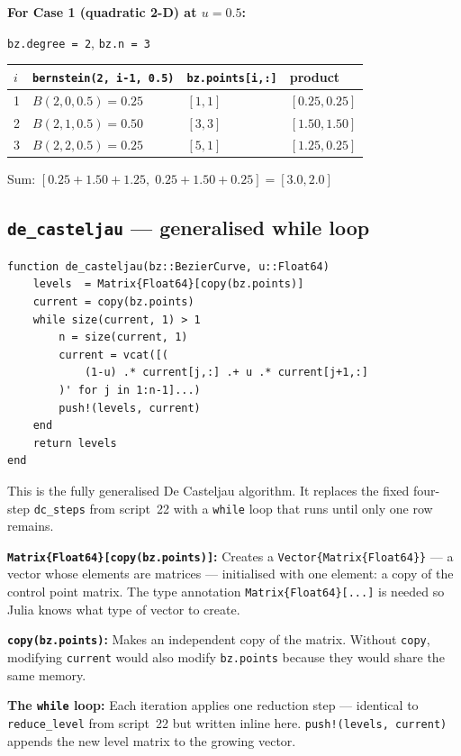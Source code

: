 \documentclass[12pt, a4paper]{article}
\newcommand{\cd}[1]{\texttt{#1}}
\begin{document}
\begin{examplebox}
\textbf{For Case 1 (quadratic 2-D) at $u = 0.5$:}

\cd{bz.degree = 2}, \cd{bz.n = 3}

\medskip
\begin{tabular}{llll}
\toprule
$i$ & \cd{bernstein(2, i-1, 0.5)} & \cd{bz.points[i,:]} & product \\
\midrule
1 & $B(2,0,0.5) = 0.25$ & $[1,1]$ & $[0.25, 0.25]$ \\
2 & $B(2,1,0.5) = 0.50$ & $[3,3]$ & $[1.50, 1.50]$ \\
3 & $B(2,2,0.5) = 0.25$ & $[5,1]$ & $[1.25, 0.25]$ \\
\bottomrule
\end{tabular}

\medskip
Sum: $[0.25+1.50+1.25,\; 0.25+1.50+0.25] = [3.0, 2.0]$ \checkmark
\end{examplebox}

\subsection{\texttt{de\_casteljau} --- generalised while loop}

\begin{verbatim}
function de_casteljau(bz::BezierCurve, u::Float64)
    levels  = Matrix{Float64}[copy(bz.points)]
    current = copy(bz.points)
    while size(current, 1) > 1
        n = size(current, 1)
        current = vcat([(
            (1-u) .* current[j,:] .+ u .* current[j+1,:]
        )' for j in 1:n-1]...)
        push!(levels, current)
    end
    return levels
end
\end{verbatim}

This is the fully generalised De Casteljau algorithm.
It replaces the fixed four-step \cd{dc\_steps} from
script~22 with a \cd{while} loop that runs until
only one row remains.

\textbf{\cd{Matrix\{Float64\}[copy(bz.points)]}:}
Creates a \cd{Vector\{Matrix\{Float64\}\}} --- a vector
whose elements are matrices --- initialised with one
element: a copy of the control point matrix.
The type annotation \cd{Matrix\{Float64\}[...]} is
needed so Julia knows what type of vector to create.

\textbf{\cd{copy(bz.points)}:}
Makes an independent copy of the matrix.
Without \cd{copy}, modifying \cd{current} would also
modify \cd{bz.points} because they would share the same
memory.

\textbf{The \cd{while} loop:}
Each iteration applies one reduction step --- identical
to \cd{reduce\_level} from script~22 but written inline
here.
\cd{push!(levels, current)} appends the new level matrix
to the growing vector.
\end{document}

